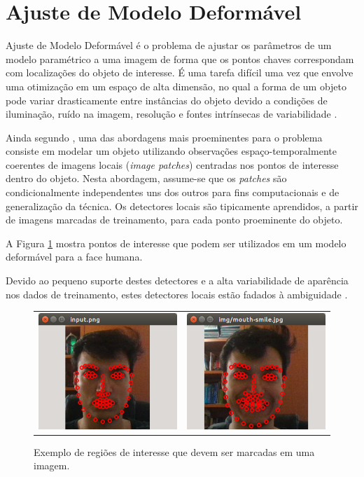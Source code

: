 \section{Ajuste de Modelo Deformável}

Ajuste de Modelo Deformável é o problema de ajustar os parâmetros de um modelo paramétrico a uma imagem de forma que os pontos chaves correspondam com localizações do objeto de interesse. É uma tarefa difícil uma vez que envolve uma otimização em um espaço de alta dimensão, no qual a forma de um objeto pode variar drasticamente entre instâncias do objeto devido a condições de iluminação, ruído na imagem, resolução e fontes intrínsecas de variabilidade \cite{saragih2011deformable}.

Ainda segundo \cite{saragih2011deformable}, uma das abordagens mais proeminentes para o problema consiste em modelar um objeto utilizando observações espaço-temporalmente coerentes de imagens locais (\textit{image patches}) centradas nos pontos de interesse dentro do objeto. Nesta abordagem, assume-se que os \textit{patches} são condicionalmente independentes uns dos outros para fins computacionais e de generalização da técnica. Os detectores locais são tipicamente aprendidos, a partir de imagens marcadas de treinamento, para cada ponto proeminente do objeto.

A Figura \ref{fig:pontos-de-interesse} mostra pontos de interesse que podem ser utilizados em um modelo deformável para a face humana.

Devido ao pequeno suporte destes detectores e a alta variabilidade de aparência nos dados de treinamento, estes detectores locais estão fadados à ambiguidade \cite{saragih2011deformable}. 

\begin{figure}[!htb]
   \centering
\begin{tabular}{cc}
\includegraphics[width=0.4\linewidth]{./figs/sample-detection.png}&
\includegraphics[width=0.4\linewidth]{./figs/sample-detection-2.png}
\end{tabular}
    \caption{Exemplo de regiões de interesse que devem ser marcadas em uma imagem.}
    \label{fig:pontos-de-interesse}
\end{figure}

